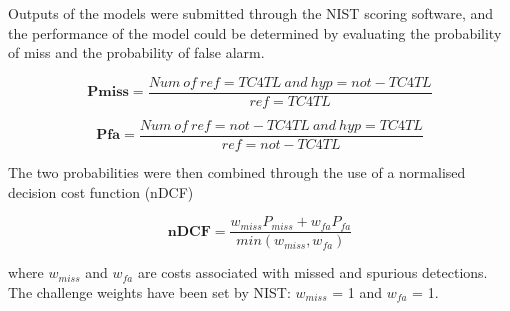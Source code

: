 \documentclass[conference]{IEEEtran}
\begin{document}
Outputs of the models were submitted  through the NIST scoring software, and the performance of the model could be determined by evaluating the probability of miss and the probability of false alarm.

\begin{equation} \label{Pmiss}
{\mathbf{\textbf{Pmiss}} ={\frac{Num\ of\ ref = TC4TL\ and\ hyp = not - TC4TL}{ref = TC4TL}}}
\end{equation}

\begin{equation} \label{Pfa}
{\mathbf{\textbf{Pfa}} ={\frac{Num\ of\ ref = not-TC4TL\ and\ hyp = TC4TL}{ref = not-TC4TL}}}
\end{equation}

The two probabilities were then combined through the use of a normalised decision cost function (nDCF)

\begin{equation} \label{nDCF}
{\mathbf{\textbf{nDCF}} ={\frac{w_{miss} P_{miss} +w_{fa} P_{fa}}{min(w_{miss} , w_{fa})}}}
\end{equation}

where $w_{miss}$ and $w_{fa}$ are costs associated with missed and spurious detections. The challenge weights have been set by NIST: $w_{miss}$ = 1 and $w_{fa}$ = 1. \cite{b7} \cite{b8} 
\end{document}
